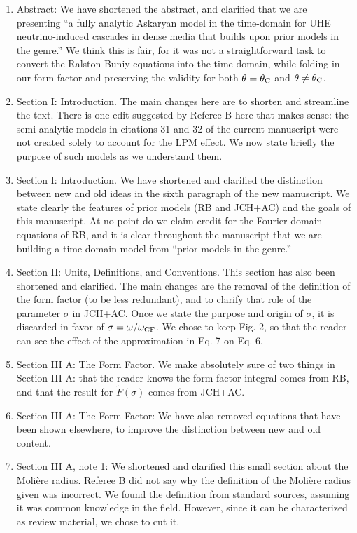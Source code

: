 \documentclass[12pt]{article}
\begin{document}
\begin{enumerate}
\item Abstract: We have shortened the abstract, and clarified that we are presenting ``a fully analytic Askaryan model in the time-domain for UHE neutrino-induced cascades in dense media that builds upon prior models in the genre.'' We think this is fair, for it was not a straightforward task to convert the Ralston-Buniy equations into the time-domain, while folding in our form factor and preserving the validity for both $\theta = \theta_{\rm C}$ and $\theta \neq \theta_{\rm C}$.
\item Section I: Introduction.  The main changes here are to shorten and streamline the text.  There is one edit suggested by Referee B here that makes sense: the semi-analytic models in citations 31 and 32 of the current manuscript were not created solely to account for the LPM effect.  We now state briefly the purpose of such models as we understand them.
\item Section I: Introduction. We have shortened and clarified the distinction between new and old ideas in the sixth paragraph of the new manuscript.  We state clearly the features of prior models (RB and JCH+AC) and the goals of this manuscript.  At no point do we claim credit for the Fourier domain equations of RB, and it is clear throughout the manuscript that we are building a time-domain model from ``prior models in the genre.''
\item Section II: Units, Definitions, and Conventions.  This section has also been shortened and clarified.  The main changes are the removal of the definition of the form factor (to be less redundant), and to clarify that role of the parameter $\sigma$ in JCH+AC.  Once we state the purpose and origin of $\sigma$, it is discarded in favor of $\sigma = \omega/\omega_{\rm CF}$.  We chose to keep Fig. 2, so that the reader can see the effect of the approximation in Eq. 7 on Eq. 6.
\item Section III A: The Form Factor.  We make absolutely sure of two things in Section III A: that the reader knows the form factor integral comes from RB, and that the result for $\widetilde{F}(\sigma)$ comes from JCH+AC.
\item Section III A: The Form Factor: We have also removed equations that have been shown elsewhere, to improve the distinction between new and old content.
\item Section III A, note 1: We shortened and clarified this small section about the Moli\`{e}re radius.  Referee B did not say why the definition of the Moli\`{e}re radius given was incorrect.  We found the definition from standard sources, assuming it was common knowledge in the field.  However, since it can be characterized as review material, we chose to cut it.

\end{enumerate}
\end{document}
